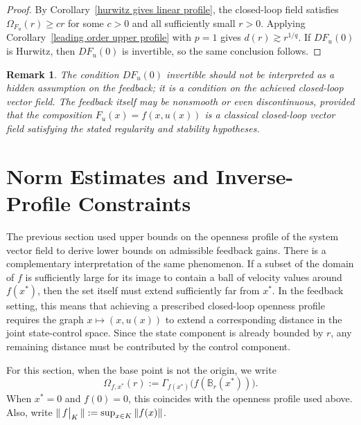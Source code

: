 \documentclass[pdflatex,sn-mathphys-num]{sn-jnl}%
\newcommand{\restr}[2]
    {
    \left.\kern-\nulldelimiterspace
    #1 
    \vphantom{\big|}
    \right|_{#2}
    }
\theoremstyle{thmstyleone}%
\theoremstyle{thmstyletwo}%
\newtheorem{remark}{Remark}%
\theoremstyle{thmstylethree}%
\begin{document}

    \begin{proof}
        By Corollary~\ref{hurwitz gives linear profile}, the closed-loop field satisfies $\Omega_{F_u}(r)\geq cr$ for some $c>0$ and all sufficiently small $r>0$.  Applying Corollary~\ref{leading order upper profile} with $p=1$ gives $d(r)\gtrsim r^{1/q}$.  If $DF_u(0)$ is Hurwitz, then $DF_u(0)$ is invertible, so the same conclusion follows.
    \end{proof}


    \begin{remark}
        The condition $DF_u(0)$ invertible should not be interpreted as a hidden assumption on the feedback; it is a condition on the achieved closed-loop vector field.  The feedback itself may be nonsmooth or even discontinuous, provided that the composition $F_u(x)=f(x,u(x))$ is a classical closed-loop vector field satisfying the stated regularity and stability hypotheses.
    \end{remark}




\section{Norm Estimates and Inverse-Profile Constraints}


    The previous section used upper bounds on the openness profile of the system vector field to derive lower bounds on admissible feedback gains.  There is a complementary interpretation of the same phenomenon.  If a subset of the domain of $f$ is sufficiently large for its image to contain a ball of velocity values around $f(x^*)$, then the set itself must extend sufficiently far from $x^*$.  In the feedback setting, this means that achieving a prescribed closed-loop openness profile requires the graph $x\mapsto (x,u(x))$ to extend a corresponding distance in the joint state-control space.  Since the state component is already bounded by $r$, any remaining distance must be contributed by the control component.

    For this section, when the base point is not the origin, we write
    $$
        \Omega_{f,x^*}(r):=\Gamma_{f(x^*)}\big(f(\mathbb{B}_r(x^*))\big).
    $$
    When $x^*=0$ and $f(0)=0$, this coincides with the openness profile used above.  Also, write $\|\restr{f}{K}\|:=\sup_{x\in K}\|f(x)\|$.
\end{document}
